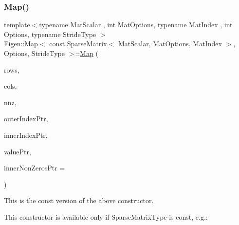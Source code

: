 \subsubsection{\texorpdfstring{Map()}{Map()}}
{\footnotesize\ttfamily template$<$typename Mat\+Scalar , int Mat\+Options, typename Mat\+Index , int Options, typename Stride\+Type $>$ \\
\mbox{\hyperlink{class_eigen_1_1_map}{Eigen\+::\+Map}}$<$ const \mbox{\hyperlink{class_eigen_1_1_sparse_matrix}{Sparse\+Matrix}}$<$ Mat\+Scalar, Mat\+Options, Mat\+Index $>$, Options, Stride\+Type $>$\+::\mbox{\hyperlink{class_eigen_1_1_map}{Map}} (\begin{DoxyParamCaption}\item[{Index}]{rows,  }\item[{Index}]{cols,  }\item[{Index}]{nnz,  }\item[{const Storage\+Index $\ast$}]{outer\+Index\+Ptr,  }\item[{const Storage\+Index $\ast$}]{inner\+Index\+Ptr,  }\item[{const Scalar $\ast$}]{value\+Ptr,  }\item[{const Storage\+Index $\ast$}]{inner\+Non\+Zeros\+Ptr = {} }\end{DoxyParamCaption})\hspace{0.3cm}{\ttfamily [inline]}}

This is the const version of the above constructor.

This constructor is available only if {\ttfamily Sparse\+Matrix\+Type} is const, e.\+g.\+: 
\begin{DoxyCode}{0}
\end{DoxyCode}
 \mbox{\label{class_eigen_1_1_map_3_01const_01_sparse_matrix_3_01_mat_scalar_00_01_mat_options_00_01_mat_index4032bba20cf92aab8bcf07e926e15a4f_aa4b0d0dd528fef0e1f8ce8c043d42b21}} 
